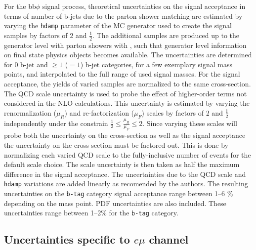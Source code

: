 \begin{itemize}
For the bb$\phi$ signal process, theoretical uncertainties on the signal acceptance in terms of number of b-jets due to the parton shower matching are estimated by varying the \texttt{hdamp} parameter of the \POWHEG MC generator used to create the signal samples by factors of 2 and $\frac{1}{2}$. 
The additional samples are produced up to the generator level with parton showers with \PYTHIA,
such that generator level information on final state physics objects becomes available. The uncertainties are determined for $0$ b-jet and $\geq 1$ ($= 1$) b-jet categories,
for a few exemplary signal mass points, and interpolated to the full range of used signal masses. For the signal acceptance, the yields of varied samples are normalized to the same
cross-section.
The QCD scale uncertainty is used to probe the effect of higher-order terms not considered in the NLO calculations. This uncertainty is estimated by varying the renormalization ($\mu_{R}$) and re-factorization ($\mu_{F}$) scales by factors of 2 and $\frac{1}{2}$ independently under the constrain $\frac{1}{2}\le\frac{\mu_{R}}{\mu_{F}}\le 2$. 
Since varying these scales will probe both the uncertainty on the cross-section as well as the signal acceptance the uncertainty on the cross-section must be factored out. 
This is done by normalizing each varied QCD scale to the fully-inclusive number of events for the default scale choice. The scale uncertainty is then taken as half the maximum difference in the signal acceptance. 
The uncertainties due to the QCD scale and \texttt{hdamp} variations are added linearly as recomended by the \POWHEG authors. The resulting uncertainties on the \texttt{b-tag} category signal acceptance range between 1--6 \% depending on the mass point. 
PDF uncertainties are also included. These uncertainties range between 1--2\% for the \texttt{b-tag} category.

\end{itemize}

\subsection{Uncertainties specific to $e\mu$ channel}

